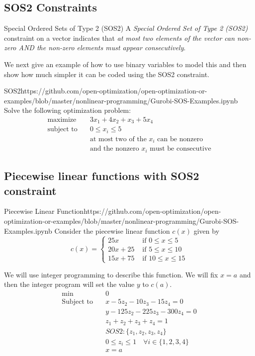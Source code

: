 \subsection{SOS2 Constraints}
\begin{definition}{Special Ordered Sets of Type 2 (SOS2)}{}
A \emph{Special Ordered Set of Type 2 (SOS2)} constraint on a vector indicates that \emph{at most two elements of the vector can non-zero AND the non-zero elements must appear consecutively}.
\end{definition}
We next give an example of how to use binary variables to model this and then show how much simpler it can be coded using the SOS2 constraint.
\begin{examplewithcode}{SOS2}{https://github.com/open-optimization/open-optimization-or-examples/blob/master/nonlinear-programming/Gurobi-SOS-Examples.ipynb}
\label{example:SOS2}
Solve the following optimization problem: \[\begin{aligned}
\text{maximize}\quad & 3x_1 + 4x_2 + x_3 + 5x_4 \\
\text{subject to}\quad & 0 \le x_i \le 5 \\
& \text{at most two of the $x_i$ can be nonzero} \\
& \text{and the nonzero $x_i$ must be consecutive}
\end{aligned}\]
\end{examplewithcode}

\subsection{Piecewise linear functions with SOS2 constraint}
\begin{examplewithcode}{Piecewise Linear Function}{https://github.com/open-optimization/open-optimization-or-examples/blob/master/nonlinear-programming/Gurobi-SOS-Examples.ipynb}
\label{example:pwl}
Consider the piecewise linear function 
 $c(x)$ given by
$$
c(x) = 
\begin{cases}
25x  & \text{ if } 0 \leq x \leq 5\\
20x + 25 & \text{ if } 5 \leq x \leq 10\\
15x + 75 & \text{ if } 10 \leq x \leq 15
\end{cases}
$$


We will use integer programming to describe this function.  We will fix $x = a$ and then the integer program will set the value $y$ to $c(a)$.
\begin{align*}
\min\quad & 0\\
\text{Subject to} \quad & x - 5 z_{2} - 10 z_{3} - 15 z_{4} = 0\\
 & y - 125 z_{2} - 225 z_{3} - 300 z_{4} = 0\\
 & z_{1} + z_{2} + z_{3} + z_{4} = 1\\
 & SOS2: \{z_1, z_2, z_3, z_4\}\\
 & 0 \leq z_{i} \leq 1 \quad\forall i \in \{1,2,3,4\}\\
 & x = a\\
\end{align*}

\end{examplewithcode}

